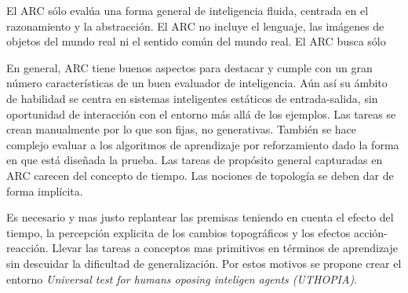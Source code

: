 El ARC sólo evalúa una forma general de inteligencia fluida, centrada en el razonamiento y la abstracción. El ARC no incluye el lenguaje, las imágenes de objetos del mundo real ni el sentido común del mundo real. El ARC busca sólo

En general, ARC tiene buenos aspectos para destacar y cumple con un gran número características de un buen evaluador de inteligencia. Aún así su ámbito de habilidad se centra en sistemas inteligentes estáticos de entrada-salida, sin oportunidad de interacción con el entorno más allá de los ejemplos. Las tareas se crean manualmente por lo que son fijas, no generativas. También se hace complejo evaluar a los algoritmos de aprendizaje por reforzamiento dado la forma en que está diseñada la prueba. Las tareas de propósito general capturadas en ARC carecen del concepto de tiempo. Las nociones de topología se deben dar de forma implícita. 

Es necesario y mas justo replantear las premisas teniendo en cuenta el efecto del tiempo, la percepción explicita de los cambios topográficos y los efectos acción-reacción. Llevar las tareas a conceptos mas primitivos en términos de aprendizaje sin descuidar la dificultad de generalización. Por estos motivos se propone crear el entorno \textit{Universal test for humans oposing inteligen agents (UTHOPIA)}.